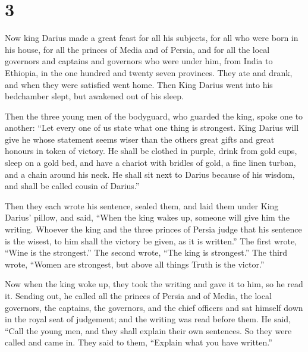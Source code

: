 \hypertarget{section-2}{%
\section{3}\label{section-2}}

 Now king Darius made a great feast for all his subjects,
for all who were born in his house, for all the princes of Media and of
Persia,  and for all the local governors and captains and
governors who were under him, from India to Ethiopia, in the one hundred
and twenty seven provinces.  They ate and drank, and when
they were satisfied went home. Then King Darius went into his bedchamber
slept, but awakened out of his sleep.

 Then the three young men of the bodyguard, who guarded the
king, spoke one to another:  ``Let every one of us state
what one thing is strongest. King Darius will give he whose statement
seems wiser than the others great gifts and great honours in token of
victory.  He shall be clothed in purple, drink from gold
cups, sleep on a gold bed, and have a chariot with bridles of gold, a
fine linen turban, and a chain around his neck.  He shall
sit next to Darius because of his wisdom, and shall be called cousin of
Darius.''

 Then they each wrote his sentence, sealed them, and laid
them under King Darius' pillow,  and said, ``When the king
wakes up, someone will give him the writing. Whoever the king and the
three princes of Persia judge that his sentence is the wisest, to him
shall the victory be given, as it is written.''  The first
wrote, ``Wine is the strongest.''  The second wrote, ``The
king is strongest.''  The third wrote, ``Women are
strongest, but above all things Truth is the victor.''

 Now when the king woke up, they took the writing and gave
it to him, so he read it.  Sending out, he called all the
princes of Persia and of Media, the local governors, the captains, the
governors, and the chief officers  and sat himself down in
the royal seat of judgement; and the writing was read before them.
 He said, ``Call the young men, and they shall explain
their own sentences. So they were called and came in.  They
said to them, ``Explain what you have written.''

